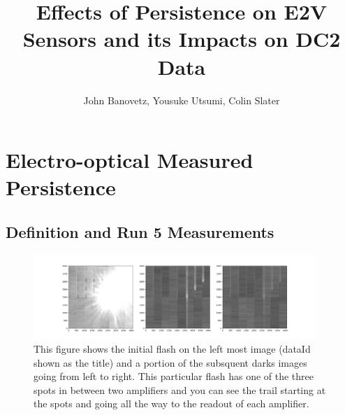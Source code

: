 \documentclass[DM,authoryear,toc]{lsstdoc}
\title{Effects of Persistence on E2V Sensors and its Impacts on DC2 Data}
\author{%
John Banovetz,
Yousuke Utsumi,
Colin Slater
}
\date{\vcsDate}
\begin{document}
\maketitle


\section{Electro-optical Measured Persistence}

\subsection{Definition and Run 5 Measurements}

\begin{figure}[!htp]
  \centering
  \includegraphics[width=0.95\textwidth, angle=0]{Run_5_persistence_ex_2.png}
  \caption{
  This figure shows the initial flash on the left most image (dataId shown as the title) and a portion of the subsquent darks images going from left to right.
  This particular flash has one of the three spots in between two amplifiers and you can see the trail starting at the spots and going all the way to the readout of each amplifier.
  }\label{fig:ex_persistence_Run5}
\end{figure}
\end{document}
